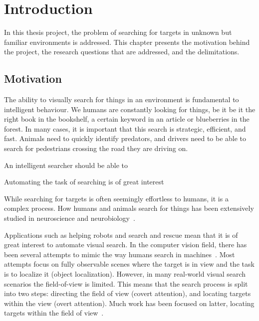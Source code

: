 
\chapter{Introduction}
\label{cha:introduction}


In this thesis project, the problem of searching for targets in unknown but familiar environments is addressed.
This chapter presents the motivation behind the project, the research questions that are addressed, and the delimitations. 

\section{Motivation}
\label{sec:motivation}


The ability to visually search for things in an environment is fundamental to intelligent behaviour.
We humans are constantly looking for things, be it be it the right book in the bookshelf, a certain keyword in an article or blueberries in the forest.
In many cases, it is important that this search is strategic, efficient, and fast.
Animals need to quickly identify predators, and drivers need to be able to search for pedestrians crossing the road they are driving on.

An intelligent searcher should be able to 

Automating the task of searching is of great interest

While searching for targets is often seemingly effortless to humans, it is a complex process.
How humans and animals search for things has been extensively studied in neuroscience and neurobiology~\cite{eckstein_visual_2011,wolfe_visual_2010,wolfe_guided_2021}.

Applications such as helping robots and search and rescue mean that it is of great interest to automate visual search.
In the computer vision field, there has been several attempts to mimic the way humans search in machines~\cite{}.
Most attempts focus on fully observable scenes where the target is in view and the task is to localize it (object localization).
However, in many real-world visual search scenarios the field-of-view is limited.
This means that the search process is split into two steps: directing the field of view (covert attention), and locating targets within the view (overt attention).
Much work has been focused on latter, locating targets within the field of view~\cite{}.

